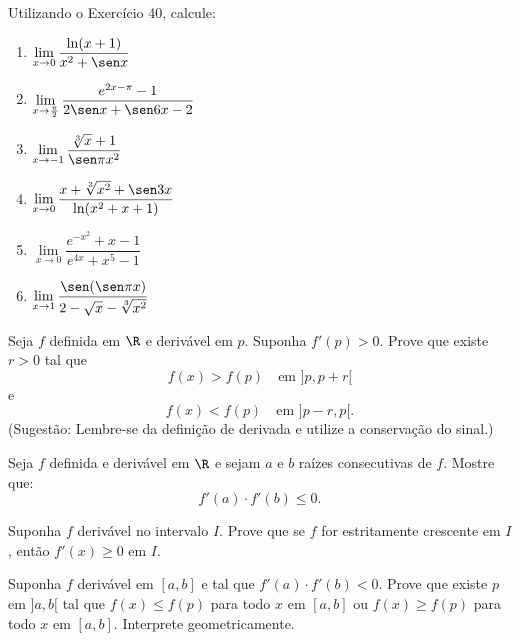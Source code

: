 \begin{exercicio}[41]
\label{ex:7.17.41}
Utilizando o Exercício 40, calcule:
\begin{enumerate}[label=\alph*)]
    \item $\lim\limits_{x \to 0} \dfrac{\ln(x + 1)}{x^2 + \sen x}$
    \item $\lim\limits_{x \to \frac{\pi}{2}} \dfrac{e^{2x - \pi} - 1}{2\sen x + \sen 6x - 2}$
    \item $\lim\limits_{x \to -1} \dfrac{\sqrt[3]{x} + 1}{\sen\pi x^2}$
    \item $\lim\limits_{x \to 0} \dfrac{x + \sqrt[3]{x^2} + \sen 3x}{\ln(x^2 + x + 1)}$
    \item $\lim\limits_{x \to 0} \dfrac{e^{-x^2} + x - 1}{e^{4x} + x^5 - 1}$
    \item $\lim\limits_{x \to 1} \dfrac{\sen(\sen\pi x)}{2 - \sqrt{x} - \sqrt[3]{x^2}}$
\end{enumerate}
\end{exercicio}

\begin{exercicio}[42]
\label{ex:7.17.42}
Seja $f$ definida em $\R$ e derivável em $p$. Suponha $f'(p) > 0$. Prove que existe $r > 0$ tal que
\[
f(x) > f(p) \quad \text{em } {]p, p + r[}
\]
e
\[
f(x) < f(p) \quad \text{em } {]p - r, p[}.
\]
(Sugestão: Lembre-se da definição de derivada e utilize a conservação do sinal.)
\end{exercicio}

\begin{exercicio}[43]
\label{ex:7.17.43}
Seja $f$ definida e derivável em $\R$ e sejam $a$ e $b$ raízes consecutivas de $f$. Mostre que:
\[
f'(a) \cdot f'(b) \le 0.
\]
\end{exercicio}

\begin{exercicio}[44]
\label{ex:7.17.44}
Suponha $f$ derivável no intervalo $I$. Prove que se $f$ for estritamente crescente em $I$, então $f'(x) \ge 0$ em $I$.
\end{exercicio}

\begin{exercicio}[45]
\label{ex:7.17.45}
Suponha $f$ derivável em $[a, b]$ e tal que $f'(a) \cdot f'(b) < 0$. Prove que existe $p$ em ${]a, b[}$ tal que $f(x) \le f(p)$ para todo $x$ em $[a, b]$ ou $f(x) \ge f(p)$ para todo $x$ em $[a, b]$. Interprete geometricamente.
\end{exercicio}

